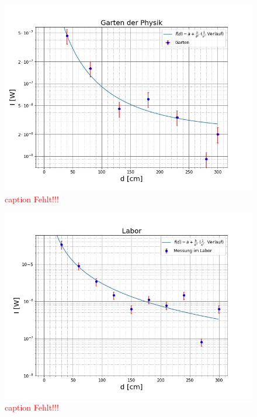 \documentclass[titlepage,11pt,a4paper,ngerman]{article}
\begin{document}
\begin{figure}[ht]
	\includegraphics[scale=0.55]{Bilder/Abstand-Garten.jpg}
	\centering
	\caption{\textcolor{red}{caption Fehlt!!!}}
	\label{Garten-A}
\end{figure}

\begin{figure}[ht]
	\includegraphics[scale=0.55]{Bilder/Abstand-Labor.jpg}
	\centering
	\caption{\textcolor{red}{caption Fehlt!!!}}
	\label{Labor-A}
\end{figure}
\end{document}
